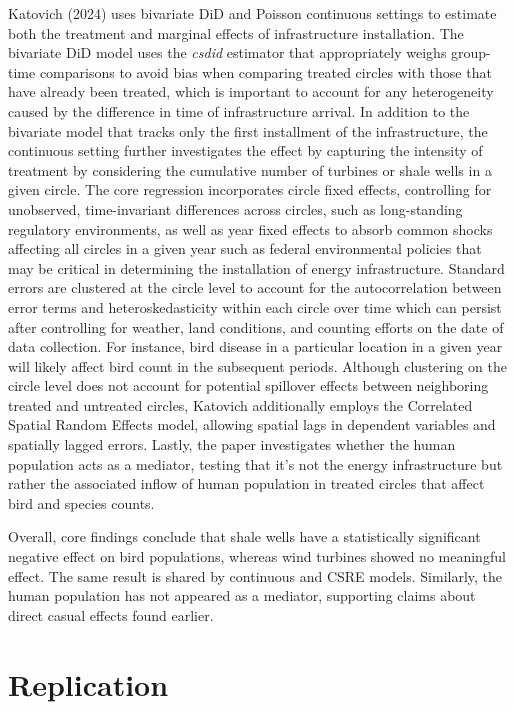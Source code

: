 \documentclass{article}
\begin{document}
Katovich (2024) uses bivariate DiD and Poisson continuous settings to estimate both the treatment and marginal effects of infrastructure installation. The bivariate DiD model uses the \textit{csdid} estimator that appropriately weighs group-time comparisons to avoid bias when comparing treated circles with those that have already been treated, which is important to account for any heterogeneity caused by the difference in time of infrastructure arrival. In addition to the bivariate model that tracks only the first installment of the infrastructure, the continuous setting further investigates the effect by capturing the intensity of treatment by considering the cumulative number of turbines or shale wells in a given circle. The core regression incorporates circle fixed effects, controlling for unobserved, time-invariant differences across circles, such as long-standing regulatory environments, as well as year fixed effects to absorb common shocks affecting all circles in a given year such as federal environmental policies that may be critical in determining the installation of energy infrastructure. Standard errors are clustered at the circle level to account for the autocorrelation between error terms and heteroskedasticity within each circle over time which can persist after controlling for weather, land conditions, and counting efforts on the date of data collection. For instance, bird disease in a particular location in a given year will likely affect bird count in the subsequent periods. Although clustering on the circle level does not account for potential spillover effects between neighboring treated and untreated circles, Katovich additionally employs the Correlated Spatial Random Effects model, allowing spatial lags in dependent variables and spatially lagged errors. Lastly, the paper investigates whether the human population acts as a mediator, testing that it's not the energy infrastructure but rather the associated inflow of human population in treated circles that affect bird and species counts.

\addlinespace

Overall, core findings conclude that shale wells have a statistically significant negative effect on bird populations, whereas wind turbines showed no meaningful effect. The same result is shared by continuous and CSRE models. Similarly, the human population has not appeared as a mediator, supporting claims about direct casual effects found earlier.

\section{Replication}
\end{document}
